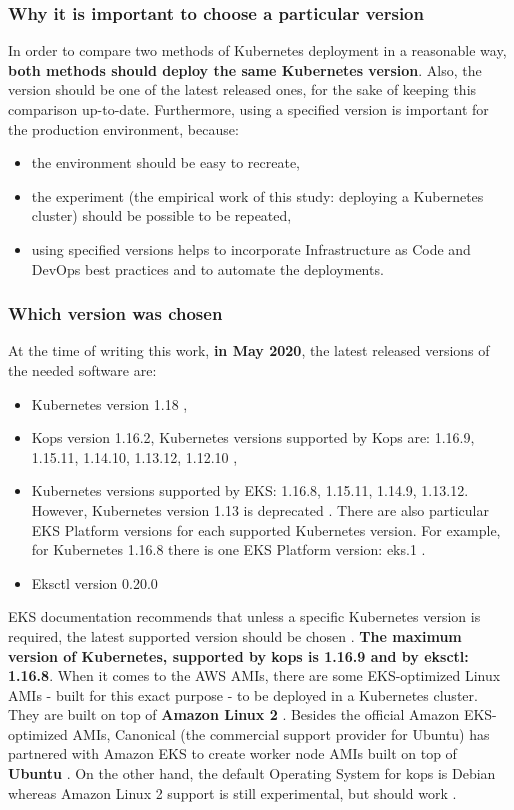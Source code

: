\subsubsection{Why it is important to choose a particular version}
In order to compare two methods of Kubernetes deployment in a reasonable way, \textbf{both methods should deploy the same Kubernetes version}. Also, the version should be one of the latest released ones, for the sake of keeping this comparison up-to-date. Furthermore, using a specified version is important for the production environment, because:
\begin{itemize}
\item the environment should be easy to recreate,
\item the experiment (the empirical work of this study: deploying a Kubernetes cluster) should be possible to be repeated,
\item using specified versions helps to incorporate Infrastructure as Code and DevOps best practices and to automate the deployments.
\end{itemize}

\subsubsection{Which version was chosen}
At the time of writing this work, \textbf{in May 2020}, the latest released versions of the needed software are:
\begin{itemize}
\item Kubernetes version 1.18 \cite{online-k8s-blog-latest},
\item Kops version 1.16.2, Kubernetes versions supported by Kops are: 1.16.9, 1.15.11, 1.14.10, 1.13.12, 1.12.10 \cite{online-kops-versions} \cite{kops-releases} \cite{online-kops-versions2},
\item Kubernetes versions supported by EKS: 1.16.8, 1.15.11, 1.14.9, 1.13.12. However, Kubernetes version 1.13 is deprecated \cite{online-eks-versions}. There are also particular EKS Platform versions for each supported Kubernetes version. For example, for Kubernetes 1.16.8 there is one EKS Platform version: eks.1 \cite{online-eks-platform-versions}.
\item Eksctl version 0.20.0 \cite{online-eksctl-versions}
\end{itemize}

EKS documentation recommends that unless a specific Kubernetes version is required, the latest supported version should be chosen \cite{online-eks-versions}. \textbf{The maximum version of Kubernetes, supported by kops is 1.16.9 and by eksctl: 1.16.8}. When it comes to the AWS AMIs, there are some EKS-optimized Linux AMIs - built for this exact purpose - to be deployed in a Kubernetes cluster. They are built on top of \textbf{Amazon Linux 2} \cite{eks-optimized-ami}. Besides the official Amazon EKS-optimized AMIs, Canonical (the commercial support provider for Ubuntu) has partnered with Amazon EKS to create worker node AMIs built on top of \textbf{Ubuntu} \cite{eks-ubu}. On the other hand, the default Operating System for kops is Debian whereas Amazon Linux 2 support is still experimental, but should work \cite{online-kops-img}.

